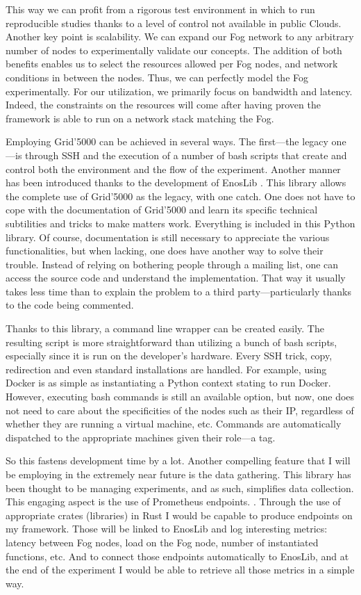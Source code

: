 \documentclass[11pt]{sdm}
\begin{document}
This way we can profit from a rigorous test environment in which to run reproducible studies thanks to a level of control not available in public Clouds. Another key point is scalability. We can expand our Fog network to any arbitrary number of nodes to experimentally validate our concepts. The addition of both benefits enables us to select the resources allowed per Fog nodes, and network conditions in between the nodes. Thus, we can perfectly model the Fog experimentally. For our utilization, we primarily focus on bandwidth and latency. Indeed, the constraints on the resources will come after having proven the framework is able to run on a network stack matching the Fog.

Employing Grid'5000 can be achieved in several ways. The first—the legacy one—is through SSH and the execution of a number of bash scripts that create and control both the environment and the flow of the experiment.
Another manner has been introduced thanks to the development of EnosLib \cite{cherrueau_enoslib_2022}. This library allows the complete use of Grid'5000 as the legacy, with one catch. One does not have to cope with the documentation of Grid'5000 and learn its specific technical subtilities and tricks to make matters work. Everything is included in this Python library. Of course, documentation is still necessary to appreciate the various functionalities, but when lacking, one does have another way to solve their trouble. Instead of relying on bothering people through a mailing list, one can access the source code and understand the implementation. That way it usually takes less time than to explain the problem to a third party—particularly thanks to the code being commented.

Thanks to this library, a command line wrapper can be created easily. The resulting script is more straightforward than utilizing a bunch of bash scripts, especially since it is run on the developer's hardware. Every SSH trick, copy, redirection and even standard installations are handled. For example, using Docker is as simple as instantiating a Python context stating to run Docker.
However, executing bash commands is still an available option, but now, one does not need to care about the specificities of the nodes such as their IP, regardless of whether they are running a virtual machine, etc. Commands are automatically dispatched to the appropriate machines given their role—a tag.

So this fastens development time by a lot. Another compelling feature that I will be employing in the extremely near future is the data gathering. This library has been thought to be managing experiments, and as such, simplifies data collection. This engaging aspect is the use of Prometheus endpoints. . Through the use of appropriate crates (libraries) in Rust I would be capable to produce endpoints on my framework. Those will be linked to EnosLib and log interesting metrics: latency between Fog nodes, load on the Fog node, number of instantiated functions, etc. And to connect those endpoints automatically to EnosLib, and at the end of the experiment I would be able to retrieve all those metrics in a simple way.
\end{document}
